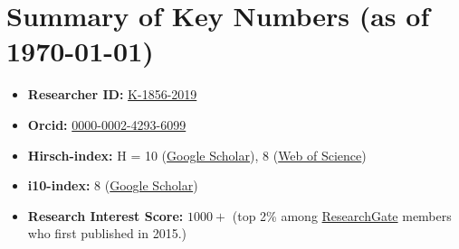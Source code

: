 \documentclass[10pt,a4paper,colorlinks,linkcolor=blue,urlcolor=blue,citecolor=blue]{moderncv}
\begin{document}
\section{Summary of Key Numbers (as of \today)}
\begin{itemize}[leftmargin=1.5em]
\item \faIdCard\hspace{0.3em}\textbf{Researcher ID:} \href{https://www.webofscience.com/wos/author/record/K-1856-2019}{K-1856-2019}
\item \faOrcid\hspace{0.3em}\textbf{Orcid:} \href{https://orcid.org/0000-0002-4293-6099}{0000-0002-4293-6099}
\item \faChartLine\hspace{0.3em}\textbf{Hirsch-index:} H = 10 (\href{https://scholar.google.com/citations?hl=en&user=tHb_qZoAAAAJ}{Google Scholar}), 8 (\href{https://www.webofscience.com/wos/author/record/K-1856-2019}{Web of Science})
\item \faFile\hspace{0.3em}\textbf{i10-index:} 8 (\href{https://scholar.google.com/citations?hl=en&user=tHb_qZoAAAAJ}{Google Scholar})
\item \faUsers\hspace{0.3em}\textbf{Research Interest Score:} \(1000+\) (top 2\% among \href{https://www.researchgate.net/profile/Vatsal-Sanjay-2}{ResearchGate} members who first published in 2015.)
\end{itemize}

\end{document}
